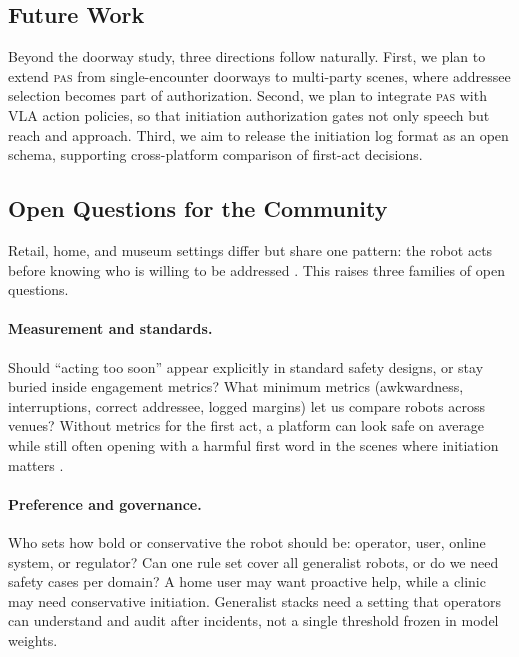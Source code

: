 \subsection{Future Work}
\label{sec:futurework}

Beyond the doorway study, three directions follow naturally. First, we plan to extend \textsc{pas} from
single-encounter doorways to multi-party scenes, where addressee
selection becomes part of authorization. Second, we plan to integrate
\textsc{pas} with VLA action policies, so that initiation authorization
gates not only speech but reach and approach. Third, we aim to release
the initiation log format as an open schema, supporting cross-platform
comparison of first-act decisions.

\subsection{Open Questions for the Community}

Retail, home, and museum settings differ but share one pattern: the
robot acts before knowing who is willing to be addressed
\citep{edirisinghe2024shopworker,shi2011spatial}. This raises three
families of open questions.

\paragraph{Measurement and standards.} Should ``acting too soon'' appear
explicitly in standard safety designs, or stay buried inside
engagement metrics? What minimum metrics (awkwardness, interruptions,
correct addressee, logged margins) let us compare robots across
venues? Without metrics for the first act, a platform can look safe on
average while still often opening with a harmful first word in the
scenes where initiation matters \citep{akalin2021}.

\paragraph{Preference and governance.} Who sets how bold or conservative
the robot should be: operator, user, online system, or regulator? Can
one rule set cover all generalist robots, or do we need safety cases
per domain? A home user may want proactive help, while a clinic may
need conservative initiation. Generalist stacks need a setting that
operators can understand and audit after incidents, not a single
threshold frozen in model weights.

